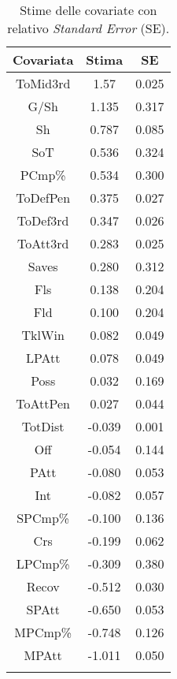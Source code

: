 \begin{table}[]%
	
	\renewcommand{\arraystretch}{1.7}
	\centering
	\begin{tabular}{c c c }
		\hline	
		
		\textbf{Covariata} & \textbf{Stima} & \textbf{SE} \\	
		\hline
		ToMid3rd & 1.57 & 0.025\\
		G/Sh & 1.135 & 0.317 \\
		Sh & 0.787 & 0.085 \\  
		SoT &  0.536 & 0.324 \\  
		PCmp\% & 0.534 & 0.300 \\
		ToDefPen & 0.375 & 0.027 \\      
		ToDef3rd & 0.347 & 0.026 \\
		ToAtt3rd & 0.283 & 0.025 \\     	     	 
		Saves & 0.280 & 0.312 \\ 
		Fls & 0.138 & 0.204  \\     
		Fld & 0.100 & 0.204  \\
		TklWin &  0.082 & 0.049  \\    
		LPAtt & 0.078 & 0.049  \\ 		
		Poss & 0.032 & 0.169 \\ 
		ToAttPen & 0.027 & 0.044 \\  
		TotDist & -0.039 & 0.001 \\  	
		Off & -0.054 & 0.144  \\
		PAtt & -0.080 & 0.053 \\ 
		Int & -0.082 & 0.057 \\  
		SPCmp\% & -0.100 & 0.136 \\ 
		Crs & -0.199 & 0.062\\  
		LPCmp\% & -0.309 & 0.380 \\ 
		Recov &  -0.512 & 0.030 \\        
		SPAtt & -0.650 & 0.053 \\     
		MPCmp\% & -0.748 & 0.126 \\
		MPAtt & -1.011 & 0.050 \\     		     		   		    
		\hline
		& &  \\
		
	\end{tabular} \hbox{}
\caption{Stime delle covariate con relativo \emph{Standard 
		Error} (SE).} \label{tab:BTC2} 
     
\end{table}

